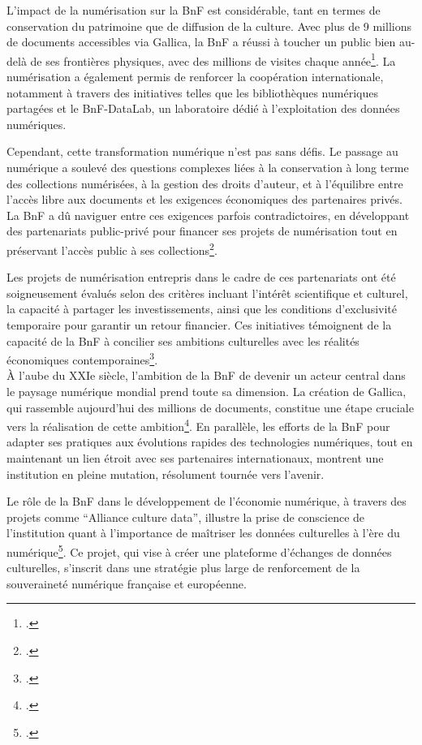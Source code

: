 \documentclass[a4paper,12pt,twoside]{book}
\begin{document}
	L’impact de la numérisation sur la BnF est considérable, tant en termes de conservation du patrimoine que de diffusion de la culture. Avec plus de 9 millions de documents accessibles via Gallica, la BnF a réussi à toucher un public bien au-delà de ses frontières physiques, avec des millions de visites chaque année\footcite{engel_numerique_2022}. La numérisation a également permis de renforcer la coopération internationale, notamment à travers des initiatives telles que les bibliothèques numériques partagées et le BnF-DataLab, un laboratoire dédié à l’exploitation des données numériques.
	
	Cependant, cette transformation numérique n’est pas sans défis. Le passage au numérique a soulevé des questions complexes liées à la conservation à long terme des collections numérisées, à la gestion des droits d’auteur, et à l’équilibre entre l’accès libre aux documents et les exigences économiques des partenaires privés. La BnF a dû naviguer entre ces exigences parfois contradictoires, en développant des partenariats public-privé pour financer ses projets de numérisation tout en préservant l’accès public à ses collections\footcite{bruckmann_numerisation_2012}.
	
	Les projets de numérisation entrepris dans le cadre de ces partenariats ont été soigneusement évalués selon des critères incluant l’intérêt scientifique et culturel, la capacité à partager les investissements, ainsi que les conditions d’exclusivité temporaire pour garantir un retour financier. Ces initiatives témoignent de la capacité de la BnF à concilier ses ambitions culturelles avec les réalités économiques contemporaines\footcite{bruckmann_numerisation_2012}.
	\\

	À l’aube du XXIe siècle, l’ambition de la BnF de devenir un acteur central dans le paysage numérique mondial prend toute sa dimension. La création de Gallica, qui rassemble aujourd’hui des millions de documents, constitue une étape cruciale vers la réalisation de cette ambition\footcite{racine_bibliotheque_2011}. En parallèle, les efforts de la BnF pour adapter ses pratiques aux évolutions rapides des technologies numériques, tout en maintenant un lien étroit avec ses partenaires internationaux, montrent une institution en pleine mutation, résolument tournée vers l’avenir.
	
	Le rôle de la BnF dans le développement de l’économie numérique, à travers des projets comme “Alliance culture data”, illustre la prise de conscience de l’institution quant à l’importance de maîtriser les données culturelles à l’ère du numérique\footcite{engel_numerique_2022}. Ce projet, qui vise à créer une plateforme d’échanges de données culturelles, s’inscrit dans une stratégie plus large de renforcement de la souveraineté numérique française et européenne.
	
\end{document}
